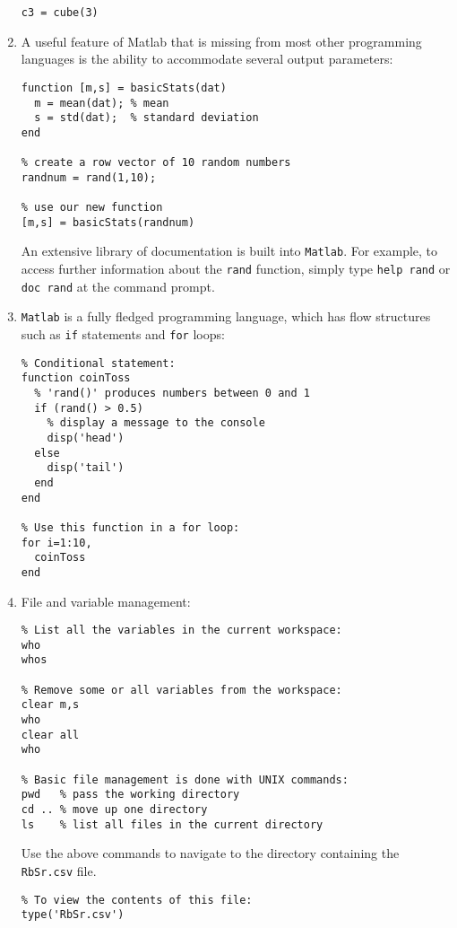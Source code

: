 \documentclass{book}
\begin{document}
\begin{enumerate}
\begin{verbatim}
c3 = cube(3)
\end{verbatim}

\item A useful feature of Matlab that is missing from most other
  programming languages is the ability to accommodate several output
  parameters:

\begin{verbatim}
function [m,s] = basicStats(dat)
  m = mean(dat); % mean
  s = std(dat);  % standard deviation
end

% create a row vector of 10 random numbers
randnum = rand(1,10);

% use our new function
[m,s] = basicStats(randnum)
\end{verbatim}

An extensive library of documentation is built into \texttt{Matlab}.
For example, to access further information about the \texttt{rand}
function, simply type \texttt{help rand} or \texttt{doc rand} at the
command prompt.

\item\texttt{Matlab} is a fully fledged programming language, which
  has flow structures such as \texttt{if} statements and \texttt{for}
  loops:

\begin{verbatim}
% Conditional statement:
function coinToss
  % 'rand()' produces numbers between 0 and 1
  if (rand() > 0.5)
    % display a message to the console
    disp('head')
  else
    disp('tail')
  end
end

% Use this function in a for loop:
for i=1:10,
  coinToss
end
\end{verbatim}

\item File and variable management:

\begin{verbatim}
% List all the variables in the current workspace:
who
whos

% Remove some or all variables from the workspace:
clear m,s
who
clear all
who

% Basic file management is done with UNIX commands:
pwd   % pass the working directory
cd .. % move up one directory
ls    % list all files in the current directory
\end{verbatim}

Use the above commands to navigate to the directory containing the
\texttt{RbSr.csv} file.

\begin{verbatim}
% To view the contents of this file:
type('RbSr.csv')


\end{verbatim}
\end{enumerate}
\end{document}
